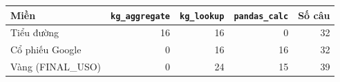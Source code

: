 \begin{tabular}{lrrrr}
\toprule
Miền & \texttt{kg\_aggregate} & \texttt{kg\_lookup} & \texttt{pandas\_calc} & Số câu \\
\midrule
Tiểu đường & 16 & 16 & 0 & 32 \\
Cổ phiếu Google & 0 & 16 & 16 & 32 \\
Vàng (FINAL\_USO) & 0 & 24 & 15 & 39 \\
\bottomrule
\end{tabular}
